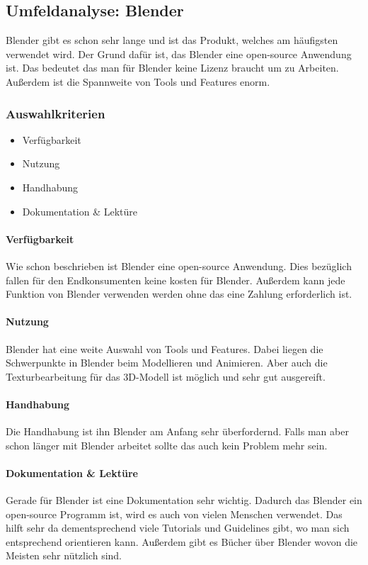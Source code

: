 \pagebreak

\subsection{Umfeldanalyse: Blender}
Blender gibt es schon sehr lange und ist das Produkt, welches am häufigsten verwendet wird. Der Grund dafür ist, das Blender eine open-source Anwendung ist. Das bedeutet das man für Blender keine Lizenz braucht um zu Arbeiten. Außerdem ist die Spannweite von Tools und Features enorm.

\subsubsection{Auswahlkriterien}
\begin{itemize}
    \item Verfügbarkeit
    \item Nutzung
    \item Handhabung
    \item Dokumentation \& Lektüre
\end{itemize}

\paragraph{Verfügbarkeit}
Wie schon beschrieben ist Blender eine open-source Anwendung. Dies bezüglich fallen für den Endkonsumenten keine kosten für Blender. Außerdem kann jede Funktion von Blender verwenden werden ohne das eine Zahlung erforderlich ist.

\paragraph{Nutzung}
Blender hat eine weite Auswahl von Tools und Features. Dabei liegen die Schwerpunkte in Blender beim Modellieren und Animieren. Aber auch die Texturbearbeitung für das 3D-Modell ist möglich und sehr gut ausgereift.

\paragraph{Handhabung}
Die Handhabung ist ihn Blender am Anfang sehr überfordernd. Falls man aber schon länger mit Blender arbeitet sollte das auch kein Problem mehr sein.

\paragraph{Dokumentation \& Lektüre}
Gerade für Blender ist eine Dokumentation sehr wichtig. Dadurch das Blender ein open-source Programm ist, wird es auch von vielen Menschen verwendet. Das hilft sehr da dementsprechend viele Tutorials und Guidelines gibt, wo man sich entsprechend orientieren kann. Außerdem gibt es Bücher über Blender wovon die Meisten sehr nützlich sind.

